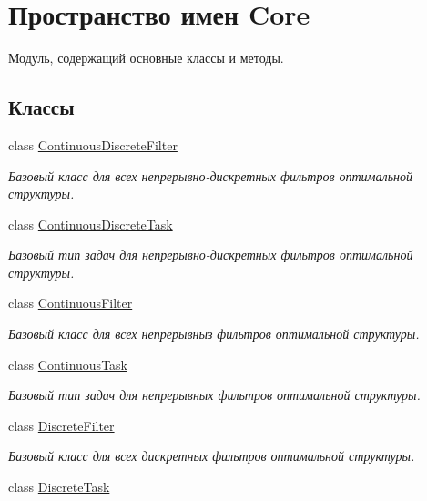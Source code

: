 \hypertarget{namespace_core}{}\section{Пространство имен Core}
\label{namespace_core}


Модуль, содержащий основные классы и методы.  


\subsection*{Классы}
\begin{DoxyCompactItemize}
\item 
class \hyperlink{class_core_1_1_continuous_discrete_filter}{Continuous\+Discrete\+Filter}
\begin{DoxyCompactList}\small\item\em Базовый класс для всех непрерывно-\/дискретных фильтров оптимальной структуры. \end{DoxyCompactList}\item 
class \hyperlink{class_core_1_1_continuous_discrete_task}{Continuous\+Discrete\+Task}
\begin{DoxyCompactList}\small\item\em Базовый тип задач для непрерывно-\/дискретных фильтров оптимальной структуры. \end{DoxyCompactList}\item 
class \hyperlink{class_core_1_1_continuous_filter}{Continuous\+Filter}
\begin{DoxyCompactList}\small\item\em Базовый класс для всех непрерывныз фильтров оптимальной структуры. \end{DoxyCompactList}\item 
class \hyperlink{class_core_1_1_continuous_task}{Continuous\+Task}
\begin{DoxyCompactList}\small\item\em Базовый тип задач для непрерывных фильтров оптимальной структуры. \end{DoxyCompactList}\item 
class \hyperlink{class_core_1_1_discrete_filter}{Discrete\+Filter}
\begin{DoxyCompactList}\small\item\em Базовый класс для всех дискретных фильтров оптимальной структуры. \end{DoxyCompactList}\item 
class \hyperlink{class_core_1_1_discrete_task}{Discrete\+Task}

\end{DoxyCompactItemize}
